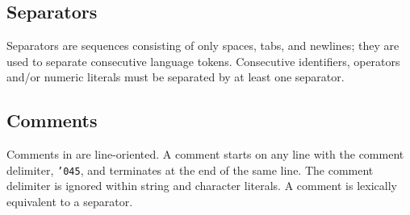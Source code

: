\subsection{Separators}
Separators are sequences consisting of only spaces, tabs, and newlines; they
are used to separate consecutive language tokens.
Consecutive identifiers, operators  and/or numeric literals must be separated
by at least one separator.

\subsection{Comments}
Comments in \emd{} are line-oriented. A comment starts on any
line with the comment
delimiter, {\tt \char '045}, and terminates at the end of the same line. The comment
delimiter is ignored within string and character literals.
A comment is lexically equivalent to a separator.
